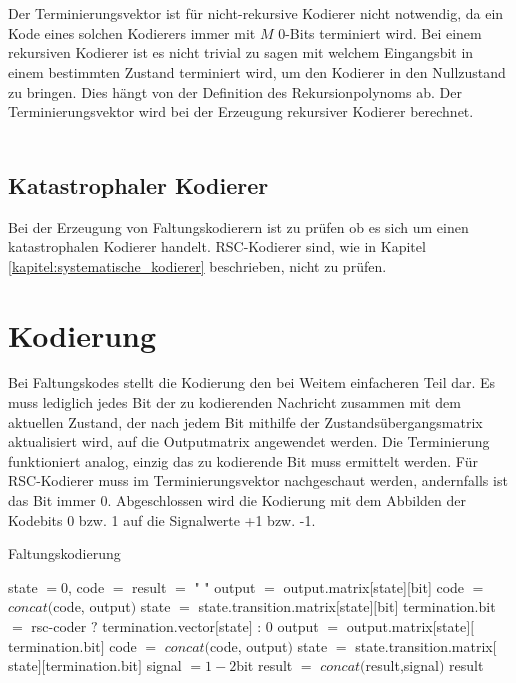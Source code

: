 \\
\\
Der Terminierungsvektor ist für nicht-rekursive Kodierer nicht notwendig, da ein Kode eines solchen Kodierers immer mit $M$ 0-Bits terminiert wird. Bei einem rekursiven Kodierer ist es nicht trivial zu sagen mit welchem Eingangsbit in einem bestimmten Zustand terminiert wird, um den Kodierer in den Nullzustand zu bringen. Dies hängt von der Definition des Rekursionpolynoms ab. Der Terminierungsvektor wird bei der Erzeugung rekursiver Kodierer berechnet.
\\
\\
\subsection{Katastrophaler Kodierer}
\label{kapitel:implementierung_katastrophaler_kodierer}
Bei der Erzeugung von Faltungskodierern ist zu prüfen ob es sich um einen katastrophalen Kodierer handelt. RSC-Kodierer sind, wie in Kapitel \ref{kapitel:systematische_kodierer} beschrieben, nicht zu prüfen.


\section{Kodierung}
\label{kapitel:implementierung_kodierung}
Bei Faltungskodes stellt die Kodierung den bei Weitem einfacheren Teil dar. Es muss lediglich jedes Bit der zu kodierenden Nachricht zusammen mit dem aktuellen Zustand, der nach jedem Bit mithilfe der Zustandsübergangsmatrix aktualisiert wird, auf die Outputmatrix angewendet werden. Die Terminierung funktioniert analog, einzig das zu kodierende Bit muss ermittelt werden. Für RSC-Kodierer muss im Terminierungsvektor nachgeschaut werden, andernfalls ist das Bit immer 0. Abgeschlossen wird die Kodierung mit dem Abbilden der Kodebits 0 bzw. 1 auf die Signalwerte +1 bzw. -1.

\begin{algorithm}[H]
\renewcommand{\algorithmicforall}{\textbf{for each}}
\caption{Faltungskodierung}
\label{algorithmus:kodierung}
\begin{algorithmic}[1]
\STATE state $=0$, code $=$ result $=$ " "
   \STATE output $=$ output.matrix[state][bit]
	\STATE code $=$ $concat($code, output$)$
	\STATE state $=$ state.transition.matrix$[$state$][$bit$]$
\ENDFOR
{}
      \STATE termination.bit $=$ rsc-coder $?$ termination.vector$[$state$]$ : $0$
      \STATE output $=$ output.matrix$[$state$][$termination.bit$]$
	   \STATE code $=$ $concat($code, output$)$
	   \STATE state $=$ state.transition.matrix$[$state$][$termination.bit$]$
   \ENDFOR
\ENDIF
{}
   \STATE signal $=1-2$bit
   \STATE result $=$ $concat($result,signal$)$
\ENDFOR
\RETURN result
\end{algorithmic}
\end{algorithm}

